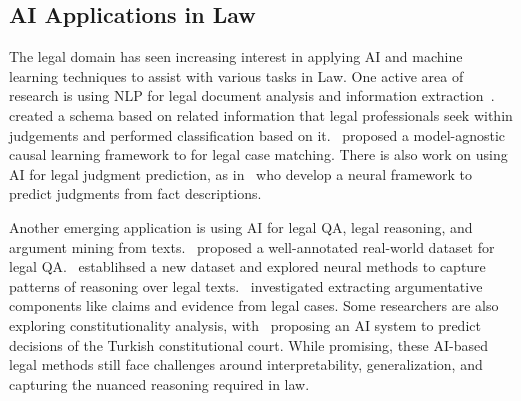 \subsection{AI Applications in Law}
The legal domain has seen increasing interest in applying AI and machine learning techniques to assist with various tasks in Law. One active area of research is using NLP for legal document analysis and information extraction~\citep{Zhong2020}.~\citet{mistica2020} created a schema based on related information that legal professionals seek within judgements and performed classification based on it.~\citet{Sun-xu-2023} proposed a model-agnostic causal learning framework to for legal case matching. There is also work on using AI for legal judgment prediction, as in~\citet{Liu-Zhang-2023} who develop a neural framework to predict judgments from fact descriptions.

Another emerging application is using AI for legal QA, legal reasoning, and argument mining from texts.~\citet{chen2023equals} proposed a well-annotated real-world dataset for legal QA.~\citet{Mumford2023} establihsed a new dataset and explored neural methods to capture patterns of reasoning over legal texts.~\citet{Zhang-Nulty-2023} investigated extracting argumentative components like claims and evidence from legal cases. Some researchers are also exploring constitutionality analysis, with~\citet{Sert2022} proposing an AI system to predict decisions of the Turkish constitutional court. While promising, these AI-based legal methods still face challenges around interpretability, generalization, and capturing the nuanced reasoning required in law.